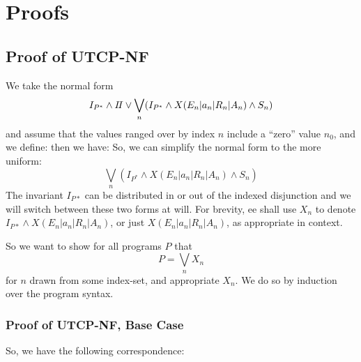 \section{Proofs}\label{sec:proofs}

\subsection{Proof of \textsf{UTCP-NF}}

We take the normal form
\[
  I_{P^*} \land I\!I
  \lor
  \bigvee_n  (I_{P^*} \land X(E_n|a_n|R_n|A_n) \land S_n)
\]
and  assume that the values ranged over by index $n$
include a ``zero'' value $n_0$,
and we define:
then we have:
So, we can simplify the normal form to the more uniform:
\[
\bigvee_n (I_{P^*} \land X(E_n|a_n|R_n|A_n) \land S_n)
\]
The invariant $I_{P*}$ can be distributed in or out of the indexed disjunction
and we will switch between these two forms at will.
For brevity, ee shall use $X_n$ to denote $ I_{P*} \land X(E_n|a_n|R_n|A_n)$,
or just $X(E_n|a_n|R_n|A_n)$, as appropriate in context.

So we want to show for all programs $P$
that
\[
 P = \bigvee_n X_n
\]
for $n$ drawn from some index-set, and appropriate $X_n$.
We do so by induction over the program syntax.

\subsubsection{Proof of \textsf{UTCP-NF}, Base Case}

So, we have the following correspondence:

